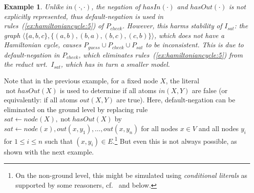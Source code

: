 \documentclass[11pt,fleqn,twoside]{article}
\def\naf{\ensuremath{\mathop{not}}}
\newtheorem{example}{Example}
\begin{document}
\begin{example}
				Unlike $\mathit{in}(\cdot,\cdot)$, the negation of $\mathit{hasIn}(\cdot)$ and $\mathit{hasOut}(\cdot)$ is not explicitly represented,
				thus default-negation is used in rules~(\ref{ex:hamiltoniancycle:5}) of $P_{\mathit{check}}$.
				However, this harms stability of $I_{\mathit{sat}}$: the graph $\langle \{ a,b,c \}, \{ (a,b), (b,a), (b,c), (c,b) \} \rangle$,
				which does not have a Hamiltonian cycle,
				causes $P_{\mathit{guess}} \cup P_{\mathit{check}} \cup P_{\mathit{sat}}$ to be inconsistent.
				This is due to default-negation in $P_{\mathit{check}}$, which eliminates rules~(\ref{ex:hamiltoniancycle:5}) from the reduct wrt.~$I_{\mathit{sat}}$,
				which has in turn a smaller model.
			\end{example}

			Note that in the previous example, for a fixed node $X$, the literal $\naf \mathit{hasOut}(X)$ is used to determine if all atoms $\mathit{in}(X,Y)$ are false (or equivalently:
			if all atoms $\mathit{out}(X,Y)$ are true). Here, default-negation can be eliminated on the ground level by replacing rule
				$\mathit{sat} \leftarrow \mathit{node}(X), \naf \mathit{hasOut}(X)$
			by
				$\mathit{sat} \leftarrow \mathit{node}(x), \mathit{out}(x,y_1), \ldots, \mathit{out}(x,y_n)$
			for all nodes $x \in V$ and all nodes $y_i$ for $1 \le i \le n$ such that $(x,y_i) \in E$.\footnote{On the non-ground level, this might be simulated using
				\emph{conditional literals} as supported by some reasoners,
			cf.~ and below.}
			But even this is not always possible, as shown with the next example.
			
\end{document}
